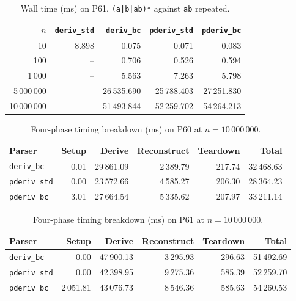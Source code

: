%

\begin{table}[H]
\centering
\small
\setlength{\tabcolsep}{4pt}
\begin{tabular*}{\textwidth}{@{\extracolsep{\fill}} r rrrr}
\hline
$n$ & \texttt{deriv\_std} & \texttt{deriv\_bc} & \texttt{pderiv\_std} & \texttt{pderiv\_bc} \\
\hline
10             &        8.898 &      0.075 &      0.071 &      0.083 \\
100            &           -- &      0.706 &      0.526 &      0.594 \\
1\,000         &           -- &      5.563 &      7.263 &      5.798 \\
5\,000\,000    &           -- & 26\,535.690 & 25\,788.403 & 27\,251.830 \\
10\,000\,000   &           -- & 51\,493.844 & 52\,259.702 & 54\,264.213 \\
\hline
\end{tabular*}
\caption{Wall time (ms) on P61, \texttt{(a|b|ab)*} against \texttt{ab}
repeated.}
\label{tab:patho-p61-all-parsers}
\end{table}

%
%
%

\begin{table}[H]
\centering
\small
\setlength{\tabcolsep}{4pt}
\begin{tabular*}{\textwidth}{@{\extracolsep{\fill}} l rrrrr}
\hline
Parser & Setup & Derive & Reconstruct & Teardown & Total \\
\hline
\texttt{deriv\_bc}        &     0.01 & 29\,861.09 & 2\,389.79 &   217.74 & 32\,468.63 \\
\texttt{pderiv\_std}      &     0.00 & 23\,572.66 & 4\,585.27 &   206.30 & 28\,364.23 \\
\texttt{pderiv\_bc}       &     3.01 & 27\,664.54 & 5\,335.62 &   207.97 & 33\,211.14 \\
\hline
\end{tabular*}
\caption{Four-phase timing breakdown (ms) on P60 at $n=10\,000\,000$.}
\label{tab:patho-phases-p60}
\end{table}

%

\begin{table}[H]
\centering
\small
\setlength{\tabcolsep}{4pt}
\begin{tabular*}{\textwidth}{@{\extracolsep{\fill}} l rrrrr}
\hline
Parser & Setup & Derive & Reconstruct & Teardown & Total \\
\hline
\texttt{deriv\_bc}        &     0.00 & 47\,900.13 & 3\,295.93 &   296.63 & 51\,492.69 \\
\texttt{pderiv\_std}      &     0.00 & 42\,398.95 & 9\,275.36 &   585.39 & 52\,259.70 \\
\texttt{pderiv\_bc}       & 2\,051.81 & 43\,076.73 & 8\,546.36 &   585.63 & 54\,260.53 \\
\hline
\end{tabular*}
\caption{Four-phase timing breakdown (ms) on P61 at $n=10\,000\,000$.}
\label{tab:patho-phases-p61}
\end{table}

